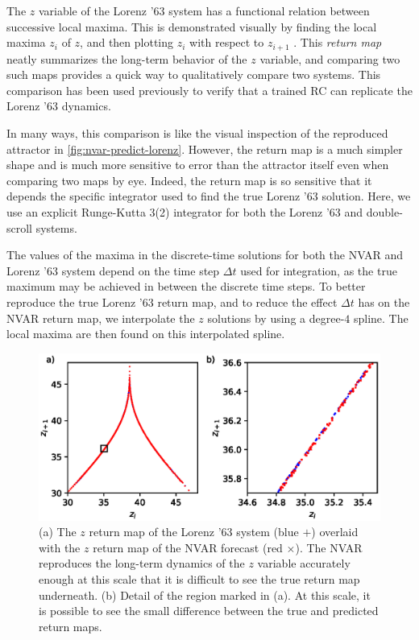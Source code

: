 The $z$ variable of the Lorenz '63 system has a functional relation
between successive local maxima. This is demonstrated visually by
finding the local maxima $z_i$ of $z$, and then plotting $z_i$ with
respect to $z_{i+1}$ \cite{lorenz1963}. This \emph{return map} neatly
summarizes the long-term behavior of the $z$ variable, and comparing
two such maps provides a quick way to qualitatively compare two
systems. This comparison has been used previously to verify that a
trained RC can replicate the Lorenz '63 dynamics. \cite{pathak2017}

In many ways, this comparison is like the visual inspection of the
reproduced attractor in \cref{fig:nvar-predict-lorenz}. However, the
return map is a much simpler shape and is much more sensitive to error
than the attractor itself even when comparing two maps by eye. Indeed,
the return map is so sensitive that it depends the specific integrator
used to find the true Lorenz '63 solution. Here, we use an explicit
Runge-Kutta 3(2)\cite{dormand1980} integrator for both the Lorenz '63
and double-scroll systems.

The values of the maxima in the discrete-time solutions for both the
NVAR and Lorenz '63 system depend on the time step $\Delta t$ used for
integration, as the true maximum may be achieved in between the
discrete time steps. To better reproduce the true Lorenz '63 return
map, and to reduce the effect $\Delta t$ has on the NVAR return map,
we interpolate the $z$ solutions by using a degree-$4$ spline. The
local maxima are then found on this interpolated spline.\cite{dierckx1995}

\begin{figure}
  \includegraphics{figures/nvar-lorenz-rmap}
  \caption{(a) The $z$ return map of the Lorenz '63 system (blue $+$)
    overlaid with the $z$ return map of the NVAR forecast (red
    $\times$). The NVAR reproduces the long-term dynamics of the $z$
    variable accurately enough at this scale that it is difficult to
    see the true return map underneath. (b) Detail of the region
    marked in (a). At this scale, it is possible to see the small
    difference between the true and predicted return maps.}
  \label{fig:nvar-lorenz-rmap}
\end{figure}

